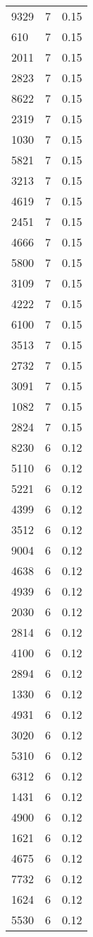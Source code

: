 \begin{table*}[htbp]
\begin{tabular}{lrr}
9329 & 7 & 0.15 \\
610 & 7 & 0.15 \\
2011 & 7 & 0.15 \\
2823 & 7 & 0.15 \\
8622 & 7 & 0.15 \\
2319 & 7 & 0.15 \\
1030 & 7 & 0.15 \\
5821 & 7 & 0.15 \\
3213 & 7 & 0.15 \\
4619 & 7 & 0.15 \\
2451 & 7 & 0.15 \\
4666 & 7 & 0.15 \\
5800 & 7 & 0.15 \\
3109 & 7 & 0.15 \\
4222 & 7 & 0.15 \\
6100 & 7 & 0.15 \\
3513 & 7 & 0.15 \\
2732 & 7 & 0.15 \\
3091 & 7 & 0.15 \\
1082 & 7 & 0.15 \\
2824 & 7 & 0.15 \\
8230 & 6 & 0.12 \\
5110 & 6 & 0.12 \\
5221 & 6 & 0.12 \\
4399 & 6 & 0.12 \\
3512 & 6 & 0.12 \\
9004 & 6 & 0.12 \\
4638 & 6 & 0.12 \\
4939 & 6 & 0.12 \\
2030 & 6 & 0.12 \\
2814 & 6 & 0.12 \\
4100 & 6 & 0.12 \\
2894 & 6 & 0.12 \\
1330 & 6 & 0.12 \\
4931 & 6 & 0.12 \\
3020 & 6 & 0.12 \\
5310 & 6 & 0.12 \\
6312 & 6 & 0.12 \\
1431 & 6 & 0.12 \\
4900 & 6 & 0.12 \\
1621 & 6 & 0.12 \\
4675 & 6 & 0.12 \\
7732 & 6 & 0.12 \\
1624 & 6 & 0.12 \\
5530 & 6 & 0.12 \\

\end{tabular}
\end{table*}
